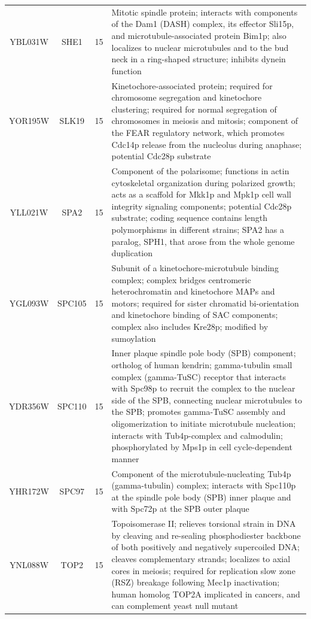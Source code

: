 \documentclass[]{article}
\begin{document}
\begin{longtable}{@{\extracolsep{3pt}} cccp{85mm}}
YBL031W & SHE1 & 15 & Mitotic spindle protein; interacts with components of the Dam1 (DASH) complex, its effector Sli15p, and microtubule-associated protein Bim1p; also localizes to nuclear microtubules and to the bud neck in a ring-shaped structure; inhibits dynein function \\ 
YOR195W & SLK19 & 15 & Kinetochore-associated protein; required for chromosome segregation and kinetochore clustering; required for normal segregation of chromosomes in meiosis and mitosis; component of the FEAR regulatory network, which promotes Cdc14p release from the nucleolus during anaphase; potential Cdc28p substrate \\ 
YLL021W & SPA2 & 15 & Component of the polarisome; functions in actin cytoskeletal organization during polarized growth; acts as a scaffold for Mkk1p and Mpk1p cell wall integrity signaling components; potential Cdc28p substrate; coding sequence contains length polymorphisms in different strains; SPA2 has a paralog, SPH1, that arose from the whole genome duplication \\ 
YGL093W & SPC105 & 15 & Subunit of a kinetochore-microtubule binding complex; complex bridges centromeric heterochromatin and kinetochore MAPs and motors; required for sister chromatid bi-orientation and kinetochore binding of SAC components; complex also includes Kre28p; modified by sumoylation \\ 
YDR356W & SPC110 & 15 & Inner plaque spindle pole body (SPB) component; ortholog of human kendrin; gamma-tubulin small complex (gamma-TuSC) receptor that interacts with Spc98p to recruit the complex to the nuclear side of the SPB, connecting nuclear microtubules to the SPB; promotes gamma-TuSC assembly and oligomerization to initiate microtubule nucleation; interacts with Tub4p-complex and calmodulin; phosphorylated by Mps1p in cell cycle-dependent manner \\ 
YHR172W & SPC97 & 15 & Component of the microtubule-nucleating Tub4p (gamma-tubulin) complex; interacts with Spc110p at the spindle pole body (SPB) inner plaque and with Spc72p at the SPB outer plaque \\ 
YNL088W & TOP2 & 15 & Topoisomerase II; relieves torsional strain in DNA by cleaving and re-sealing phosphodiester backbone of both positively and negatively supercoiled DNA; cleaves complementary strands; localizes to axial cores in meiosis; required for replication slow zone (RSZ) breakage following Mec1p inactivation; human homolog TOP2A implicated in cancers, and can complement yeast null mutant \\ 

\end{longtable}
\end{document}
